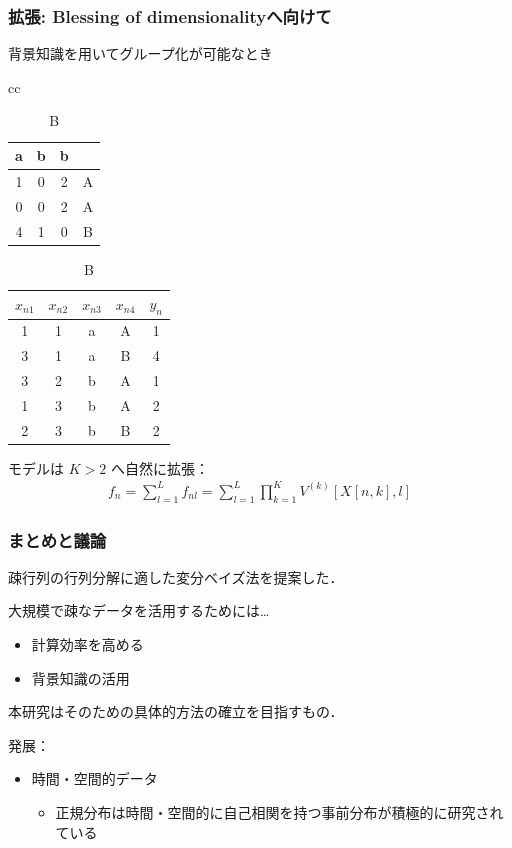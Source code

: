 \documentclass[dvipdfmx, dvipsnames]{beamer}
\begin{document}
\begin{frame}
\frametitle{拡張: Blessing of dimensionalityへ向けて}

背景知識を用いてグループ化が可能なとき

\begin{table}[tbp]
\centering
\caption{行・列に注釈のついた行列. A表はB表のように表せる．}
\begin{tabular}{cc}
\begin{minipage}{0.25\linewidth}
\centering
{
\caption{A}
\begin{tabular}{|ccc|c|}
\hline
 a & b & b & \\
\hline
 1 & 0 & 2 &A \\
 0 & 0 & 2 &A\\
 4 & 1 & 0 &B\\
\hline
\end{tabular}
}
\end{minipage}
\begin{minipage}{0.35\linewidth}
\centering
{
\caption{B}
\begin{tabular}{ccccc}
\hline
$x_{n1}$ & $x_{n2}$& $x_{n3}$ & $x_{n4}$ & $y_n$\\
\hline
1 & 1 &a & A & 1\\
3 & 1 & a & B & 4\\
3 & 2 & b & A& 1\\
1 & 3 & b & A& 2\\
2 & 3 & b & B& 2\\
\hline
\end{tabular}
}
\end{minipage}
\end{tabular}
\end{table}

モデルは $K>2$ へ自然に拡張：
\begin{align*}
f_n =\sum_{l=1}^L f_{nl} =\sum_{l=1}^L \prod_{k=1}^{K} V^{(k)} [X[n,k], l] 
\end{align*}
\end{frame}

\begin{frame}
\frametitle{まとめと議論}

疎行列の行列分解に適した変分ベイズ法を提案した．

大規模で疎なデータを活用するためには…
\begin{itemize}
\item 計算効率を高める
\item 背景知識の活用
\end{itemize}

本研究はそのための具体的方法の確立を目指すもの．

\vfill

発展：
\begin{itemize}
\item 時間・空間的データ
\begin{itemize}
\item 正規分布は時間・空間的に自己相関を持つ事前分布が積極的に研究されている
\end{itemize}
\end{itemize}

\end{frame}
\end{document}

